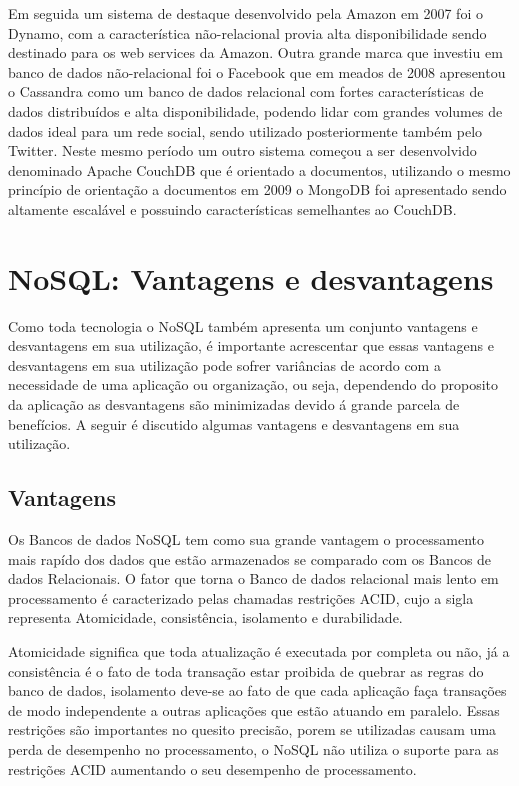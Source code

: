 \documentclass[12pt]{article}
\begin{document}
Em seguida um sistema de destaque desenvolvido pela Amazon em 2007 foi o Dynamo, com a característica não-relacional provia alta disponibilidade sendo destinado para os web services da Amazon. Outra grande marca que investiu em banco de dados não-relacional foi o Facebook que em meados de 2008 apresentou o Cassandra como um banco de dados relacional com fortes características de dados distribuídos e alta disponibilidade, podendo lidar com grandes volumes de dados ideal para um rede social, sendo utilizado posteriormente também pelo Twitter. Neste mesmo período um outro sistema começou a ser desenvolvido denominado Apache CouchDB que é orientado a documentos, utilizando o mesmo princípio  de orientação a documentos em 2009 o MongoDB foi apresentado sendo altamente escalável e possuindo características semelhantes ao CouchDB.\cite{brito2010bancos}

\section{NoSQL: Vantagens e desvantagens}
\label{sec:vantagensedesvantagens}

Como toda tecnologia o NoSQL também apresenta um conjunto vantagens e desvantagens em sua utilização, é importante acrescentar que essas vantagens e desvantagens em sua utilização pode sofrer variâncias de acordo com a necessidade de uma aplicação ou organização, ou seja, dependendo do proposito da aplicação as desvantagens são minimizadas devido á grande parcela de benefícios. A seguir é discutido algumas vantagens e desvantagens em sua utilização.

\subsection{Vantagens}
\label{subsec:vantagens}

Os Bancos de dados NoSQL tem como sua grande vantagem o processamento mais rapído dos dados que estão armazenados se comparado com os Bancos de dados Relacionais. O fator que torna o Banco de dados relacional mais lento em processamento é caracterizado pelas chamadas restrições ACID, cujo a sigla representa Atomicidade, consistência, isolamento e durabilidade. 

Atomicidade significa que toda atualização é executada por completa ou não, já a consistência é o fato de toda transação estar proibida de quebrar as regras do banco de dados, isolamento deve-se ao fato de que cada aplicação faça transações de modo independente a outras aplicações que estão atuando em paralelo. Essas restrições são importantes no quesito precisão, porem se utilizadas causam uma perda de desempenho no processamento, o NoSQL não utiliza o suporte para as restrições ACID aumentando o seu desempenho de processamento.\cite{leavitt:2010}
\end{document}
